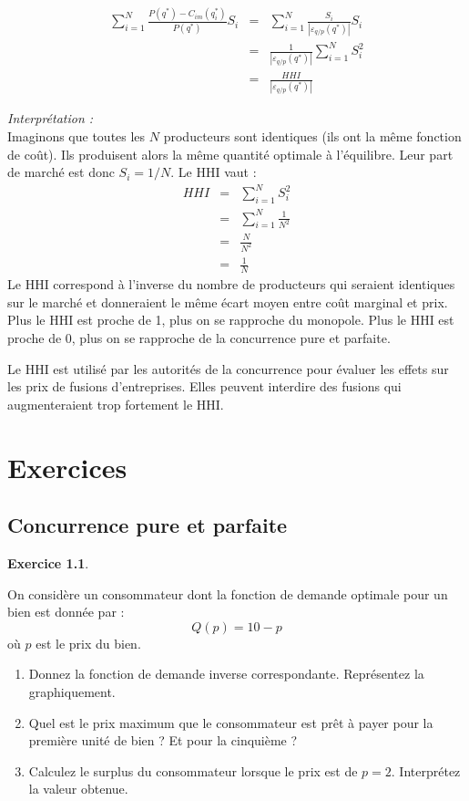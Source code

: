 \documentclass[
]{book}
\providecommand{\tightlist}{%
  \setlength{\itemsep}{0pt}\setlength{\parskip}{0pt}}
\theoremstyle{definition}
\theoremstyle{definition}
\theoremstyle{definition}
\newtheorem{exercise}{Exercice}[chapter]
\theoremstyle{definition}
\theoremstyle{remark}
\begin{document}
\[
 \begin{array}{rcl}
 \sum_{i=1}^{N}\frac{P(q^*) -C_{im}(q_i^*)}{P(q^*)}S_i &=&\sum_{i=1}^{N} \frac{S_i}{\left|\varepsilon_{q/p}(q^*)\right|}S_i \\
 &=&\frac{1}{\left|\varepsilon_{q/p}(q^*)\right|}\sum_{i=1}^NS_i^2\\
 &=&\frac{HHI}{\left|\varepsilon_{q/p}(q^*)\right|}
 \end{array}
 \]

\emph{Interprétation :}\\
Imaginons que toutes les \(N\) producteurs sont identiques (ils ont la même fonction de coût).
Ils produisent alors la même quantité optimale à l'équilibre.
Leur part de marché est donc \(S_i=1/N\).
Le HHI vaut :
\[
\begin{array}{rcl}
HHI&=&\sum_{i=1}^NS_i^2\\
&=&\sum_{i=1}^N\frac{1}{N^2}\\
&=&\frac{N}{N^2} \\
&=&\frac{1}{N}
\end{array}
\]
Le HHI correspond à l'inverse du nombre de producteurs qui seraient identiques sur le marché et donneraient le même écart moyen entre coût marginal et prix.
Plus le HHI est proche de 1, plus on se rapproche du monopole.
Plus le HHI est proche de 0, plus on se rapproche de la concurrence pure et parfaite.

Le HHI est utilisé par les autorités de la concurrence pour évaluer les effets sur les prix de fusions d'entreprises.
Elles peuvent interdire des fusions qui augmenteraient trop fortement le HHI.

\hypertarget{exercices}{%
\chapter{Exercices}\label{exercices}}

\hypertarget{concurrence-pure-et-parfaite}{%
\section{Concurrence pure et parfaite}\label{concurrence-pure-et-parfaite}}

\begin{exercise}
\protect\hypertarget{exr:cppexo1}{}\label{exr:cppexo1}

On considère un consommateur dont la fonction de demande optimale pour un bien est donnée par :
\[
Q(p)=10-p
\]
où \(p\) est le prix du bien.

\begin{enumerate}
\def\labelenumi{\arabic{enumi}.}
\tightlist
\item
  Donnez la fonction de demande inverse correspondante. Représentez la graphiquement.
\item
  Quel est le prix maximum que le consommateur est prêt à payer pour la première unité de bien ? Et pour la cinquième ?
\item
  Calculez le surplus du consommateur lorsque le prix est de \(p=2\). Interprétez la valeur obtenue.
\end{enumerate}

\end{exercise}
\end{document}

